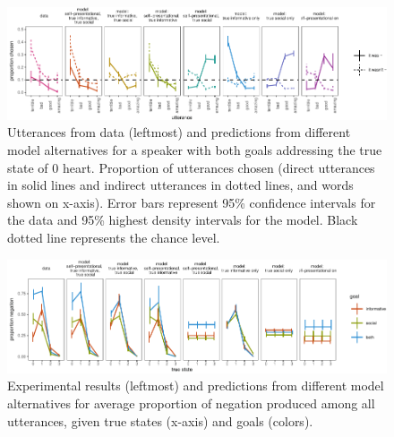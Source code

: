 \documentclass[12pt]{article}
\begin{document}
\begin{figure}
\centering
\includegraphics{politeness_files/figure-latex/utterancePredictionComp-1.pdf}
\caption{\label{fig:utterancePredictionComp}Utterances from data (leftmost)
and predictions from different model alternatives for a speaker with
both goals addressing the true state of 0 heart. Proportion of
utterances chosen (direct utterances in solid lines and indirect
utterances in dotted lines, and words shown on x-axis). Error bars
represent 95\% confidence intervals for the data and 95\% highest
density intervals for the model. Black dotted line represents the chance
level.}
\end{figure}

\begin{figure}
\centering
\includegraphics{politeness_files/figure-latex/negationPredictionComp-1.pdf}
\caption{\label{fig:negationPredictionComp}Experimental results (leftmost)
and predictions from different model alternatives for average proportion
of negation produced among all utterances, given true states (x-axis)
and goals (colors).}
\end{figure}




\end{document}
